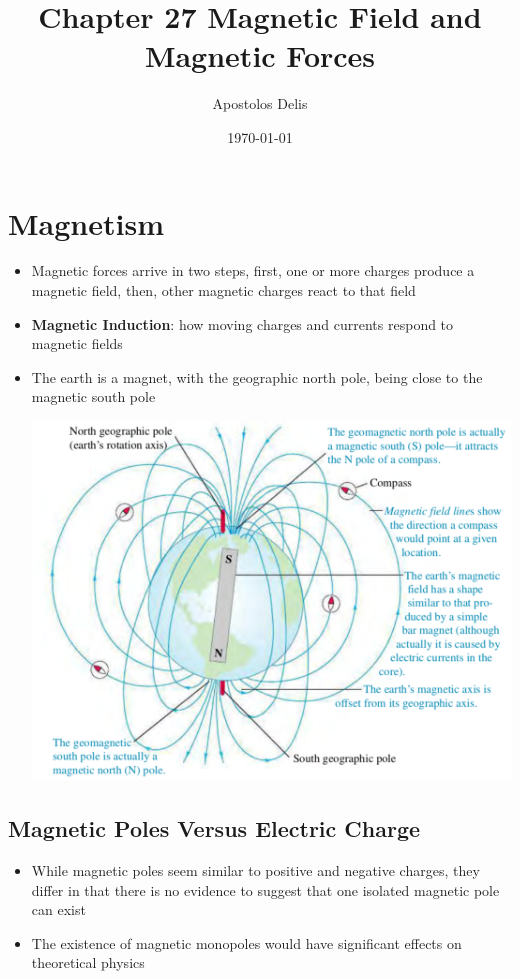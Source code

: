 \documentclass[11pt, a4paper]{article}
\begin{document}
\title{Chapter 27 Magnetic Field and Magnetic Forces}
\author{Apostolos Delis}
\date{\today}
\maketitle

\tableofcontents
\section[27.1 Magnetism]{Magnetism}
\begin{itemize}
    \item Magnetic forces arrive in two steps, first, one or more charges produce a
        magnetic field, then, other magnetic charges react to that field
    \item \textbf{Magnetic Induction}: how moving charges and currents respond to
        magnetic fields
    \item The earth is a magnet, with the geographic north pole, being close to the
        magnetic south pole

    \includegraphics[scale=0.50]{images/earth's_poles.png}
\end{itemize}

\subsection{Magnetic Poles Versus Electric Charge}
\begin{itemize}
    \item While magnetic poles seem similar to positive and negative charges, they differ
        in that there is no evidence to suggest that one isolated magnetic pole can exist
    \item The existence of magnetic monopoles would have significant effects on
        theoretical physics
\end{itemize}
\end{document}
